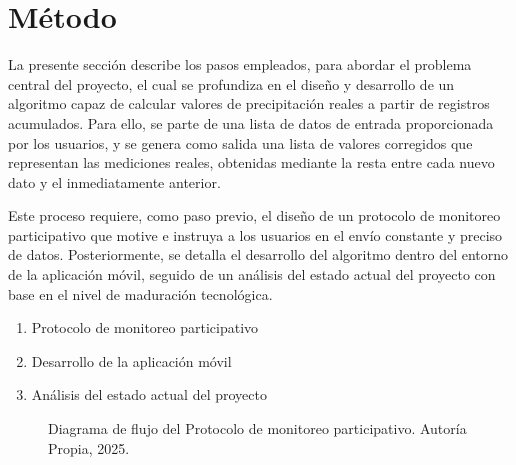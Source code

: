 \section{Método}
La presente sección describe los pasos empleados, para abordar el problema central del proyecto, el cual se profundiza en el diseño y desarrollo de un algoritmo capaz de calcular valores de precipitación reales a partir de registros acumulados. Para ello, se parte de una lista de datos de entrada proporcionada por los usuarios, y se genera como salida una lista de valores corregidos que representan las mediciones reales, obtenidas mediante la resta entre cada nuevo dato y el inmediatamente anterior.

Este proceso requiere, como paso previo, el diseño de un protocolo de monitoreo participativo que motive e instruya a los usuarios en el envío constante y preciso de datos. Posteriormente, se detalla el desarrollo del algoritmo dentro del entorno de la aplicación móvil, seguido de un análisis del estado actual del proyecto con base en el nivel de maduración tecnológica.

\begin{enumerate}
  \item Protocolo de monitoreo participativo
  \item Desarrollo de la aplicación móvil
  \item Análisis del estado actual del proyecto
\end{enumerate}


\begin{figure}[h!]
    \centering
    \caption{Diagrama de flujo del Protocolo de monitoreo participativo. Autoría Propia, 2025.}
    \label{t2}
\end{figure} 


